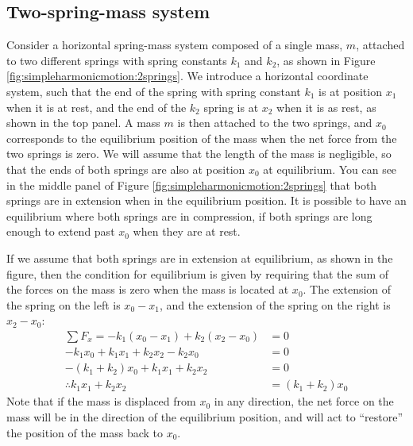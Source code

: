 \subsection{Two-spring-mass system}
Consider a horizontal spring-mass system composed of a single mass, $m$, attached to two different springs with spring constants $k_1$ and $k_2$, as shown in Figure \ref{fig:simpleharmonicmotion:2springs}.
We introduce a horizontal coordinate system, such that the end of the spring with spring constant $k_1$ is at position $x_1$ when it is at rest, and the end of the $k_2$ spring is at $x_2$ when it is as rest, as shown in the top panel. A mass $m$ is then attached to the two springs, and $x_0$ corresponds to the equilibrium position of the mass when the net force from the two springs is zero. We will assume that the length of the mass is negligible, so that the ends of both springs are also at position $x_0$ at equilibrium. You can see in the middle panel of Figure \ref{fig:simpleharmonicmotion:2springs} that both springs are in extension when in the equilibrium position. It is possible to have an equilibrium where both springs are in compression, if both springs are long enough to extend past $x_0$ when they are at rest. 

If we assume that both springs are in extension at equilibrium, as shown in the figure, then the condition for equilibrium is given by requiring that the sum of the forces on the mass is zero when the mass is located at $x_0$. The extension of the spring on the left is $x_0 - x_1$, and the extension of the spring on the right is $x_2-x_0$:
\begin{align*}
\sum F_x = -k_1(x_0-x_1) + k_2 (x_2 - x_0) &= 0\\
-k_1x_0+k_1x_1+k_2x_2-k_2x_0 &=0\\
-(k_1+k_2)x_0 +k_1x_1+k_2x_2 &=0\\
\therefore k_1x_1+k_2x_2 &=(k_1+k_2)x_0
\end{align*}
Note that if the mass is displaced from $x_0$ in any direction, the net force on the mass will be in the direction of the equilibrium position, and will act to ``restore'' the position of the mass back to $x_0$. 

